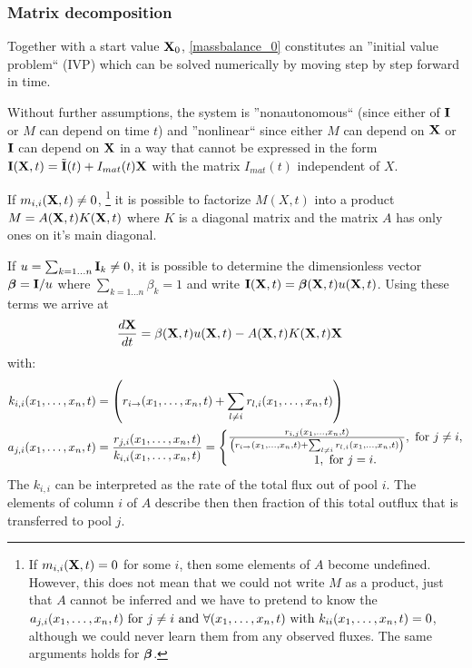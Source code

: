 \subsubsection{Matrix decomposition} 
Together with a start value $\mathbf{X}_0$, \eqref{massbalance_0} constitutes an ''initial value problem`` (IVP) which can be solved numerically by moving step by step forward in time.

%

Without further assumptions, the system is ''nonautonomous`` (since either of $\mathbf{I}$ or $M$ can depend on time $t$) 
and ''nonlinear`` since either $M$ can depend on $\mathbf{X}$ or $\mathbf{I}$ can depend on $\mathbf{X}$ in a way that cannot be expressed in the form $\mathbf{I}(\mathbf{X},t)=\tilde{\mathbf{I}}(t)+I_{mat}(t)\mathbf{X}$ with the matrix $I_{mat}(t)$ independent of $X$.

If $m_{i,i}(\mathbf{X},t) \ne 0$, 
\footnote{
  If $m_{i,i}(\mathbf{X},t) = 0$ for some $i$, then some elements of $A$ become
  undefined. However, this does not mean that we could not write $M$ as a
  product, just that $A$ cannot be inferred and we have to pretend to know the
  $a_{j,i}(x_1, \dots, x_n, t) \text{ for } j\ne i \text{ and } \forall (x_1, \dots, x_n, t) \text{ with }
  k_{ii}(x_1, \dots, x_n, t)=0$, although we could never learn them from any observed fluxes.
  The same arguments holds for $\bm{\beta}$.
}
it is possible to factorize $M(X,t)$ into a product $M=A(\mathbf{X},t) K(\mathbf{X},t)$ where $K$ is
a diagonal matrix and the matrix $A$ has only ones on it's main diagonal. 

If $u=\sum_{k=1\dots n} \mathbf{I}_k \ne 0$, it is possible to determine the dimensionless vector $\bm{\beta} = \mathbf{I}/u$ where $\sum_{k=1\dots n} \beta_k =1$ and write $\mathbf{I}(\mathbf{X},t)=\bm{\beta}(\mathbf{X},t)u(\mathbf{X},t)$.
Using these terms  we arrive at 
\begin{align*}
\frac{d \mathbf{X}}{d t}&=\beta(\mathbf{X},t) u(\mathbf{X},t) - A(\mathbf{X},t) K(\mathbf{X},t) \mathbf{X}   
\end{align*}
\newcommand{\kiixt}{
      \left(
      r_{i \rightarrow } \xnt
      + 
      \sum_{l \ne i} r_{l,i} \xnt
      \right)
}
with:
\begin{align}
  k_{i,i}\xnt &=\kiixt \nonumber
  \\
  a_{j,i}\xnt
  &=\frac{r_{j,i}\xnt}{k_{i,i}\xnt}=
  \left\{
  \begin{matrix}
    \frac{
    r_{i,j}\xnt 
  }{
    \kiixt
  }, \text{ for } j \ne i,
  \\
  1, \text{ for } j=i.
  \end{matrix}
  \right.
  \label{aij}
\end{align}
The $k_{i,i}$ can be interpreted as the rate of the total flux out of pool $i$. The elements of column $i$ of $A$ describe then then fraction of this total outflux that is transferred to pool $j$. 

